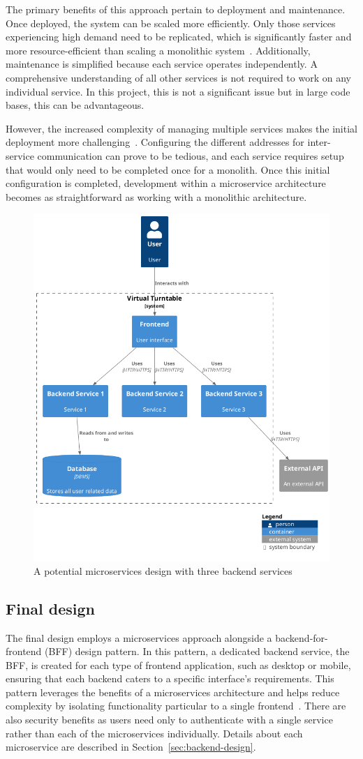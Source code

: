 The primary benefits of this approach pertain to deployment and maintenance. Once deployed, the system can be scaled more efficiently. Only those services experiencing high demand need to be replicated, which is significantly faster and more resource-efficient than scaling a monolithic system~\cite{9717259}. Additionally, maintenance is simplified because each service operates independently. A comprehensive understanding of all other services is not required to work on any individual service. In this project, this is not a significant issue but in large code bases, this can be advantageous.

However, the increased complexity of managing multiple services makes the initial deployment more challenging~\cite{9717259}. Configuring the different addresses for inter-service communication can prove to be tedious, and each service requires setup that would only need to be completed once for a monolith. Once this initial configuration is completed, development within a microservice architecture becomes as straightforward as working with a monolithic architecture.

\begin{figure} [H]
    \centering
    \includegraphics[width=0.4\linewidth]{figures/microservices_arch.png}
    \caption{A potential microservices design with three backend services}
    \label{fig:microservices-arch}
\end{figure}

\subsection{Final design}
The final design employs a microservices approach alongside a backend-for-frontend (BFF) design pattern. In this pattern, a dedicated backend service, the BFF, is created for each type of frontend application, such as desktop or mobile, ensuring that each backend caters to a specific interface’s requirements. This pattern leverages the benefits of a microservices architecture and helps reduce complexity by isolating functionality particular to a single frontend~\cite{BFF}. There are also security benefits as users need only to authenticate with a single service rather than each of the microservices individually. Details about each microservice are described in Section~\ref{sec:backend-design}.

